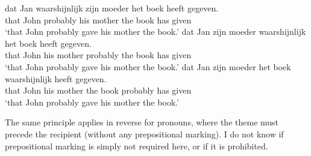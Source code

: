 \begin{exe}
\ex
\begin{xlist}
\ex \gll dat Jan waarshijnlijk zijn moeder het boek heeft gegeven.\\
that John probably his mother the book has given\\ 
\trans `that John probably gave his mother the book.' \cite[ex 49a]{Broekhuis.2012}
\ex \gll dat Jan zijn moeder waarshijnlijk het boek heeft gegeven.\\
that John his mother probably the book has given\\
\trans `that John probably gave his mother the book.' \cite[ex 49b]{Broekhuis.2012}
\ex \gll dat Jan zijn moeder het boek waarshijnlijk heeft gegeven. \\
that John his mother the book probably has given\\
\trans `that John probably gave his mother the book.' \cite[ex 49c]{Broekhuis.2012}
\end{xlist}
\end{exe}
The same principle applies in reverse for pronouns, where the theme must precede the recipient (without any prepositional marking). I do not know if prepositional marking is simply not required here, or if it is prohibited.
\begin{exe}
\ex
\begin{xlist}
\end{xlist}
\end{exe}

